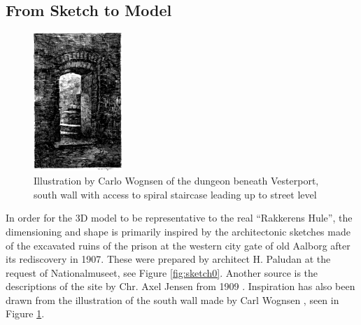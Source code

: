 \subsection{From Sketch to Model}
\begin{figure}
\centering
        \includegraphics[width=0.3\textwidth]{figures/sketch1.png}
        \caption{Illustration by Carlo Wognsen of the dungeon beneath Vesterport, south wall with access to spiral staircase leading up to street level \cite{Riismoller1961}}\label{fig:sketch1}
\end{figure}

In order for the 3D model to be representative to the real “Rakkerens Hule”, the dimensioning and shape is primarily inspired by the architectonic sketches made of the excavated ruins of the prison at the western city gate of old Aalborg after its rediscovery in 1907. These were prepared by architect H. Paludan at the request of Nationalmuseet, see Figure \ref{fig:sketch0}. Another source is the descriptions of the site by Chr. Axel Jensen from 1909 \cite{Jensen1909}. Inspiration has also been drawn from the illustration of the south wall made by Carl Wognsen \cite{Riismoller1961}, seen in Figure \ref{fig:sketch1}.

